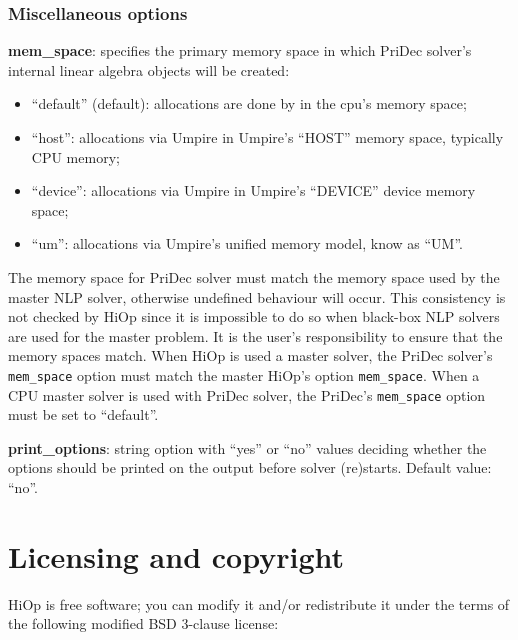 \subsubsection{Miscellaneous options}


\noindent \textbf{mem\_space}: specifies the primary memory space in which PriDec solver's internal linear algebra objects will be created:
\begin{itemize}
\item ``default'' (default): allocations are done by \Hi in the cpu's memory space;
\item ``host'':  allocations via Umpire in Umpire's ``HOST'' memory space, typically CPU memory;
\item ``device'': allocations via Umpire in Umpire's ``DEVICE'' device memory space;
\item ``um'': allocations via Umpire's unified memory model, know as ``UM''.
\end{itemize}
\warningcp{} The memory space for PriDec solver must match the memory space used by the master NLP solver, otherwise undefined behaviour will occur. This consistency is not checked by HiOp since it is impossible to do so when black-box NLP solvers are used for the master problem. It is the user's responsibility to ensure that the memory spaces match. When HiOp is used a master solver, the PriDec solver's \texttt{mem\_space} option must match the master HiOp's option \texttt{mem\_space}. When a CPU master solver is used with PriDec solver, the PriDec's \texttt{mem\_space} option must be set to ``default''.


\medskip

\noindent \textbf{print\_options}: string option with ``yes'' or ``no'' values deciding whether the options should be printed on the output before solver (re)starts. Default value: ``no''.

%

\section{Licensing and copyright}
HiOp is free software; you can modify it and/or redistribute it under the terms of the following  modified BSD 3-clause license:

